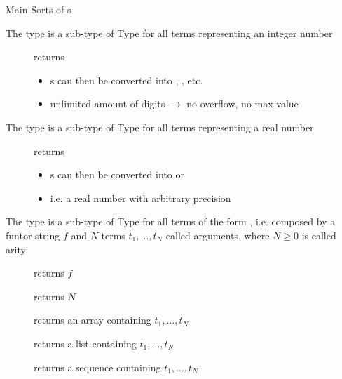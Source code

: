 \documentclass[handout]{beamer}
\begin{document}
\begin{frame}[allowframebreaks]{Main Sorts of s}
    \framebreak

    \begin{block}{The  type is a sub-type of }\centering
        Type for all terms representing an integer number
    \end{block}
    \begin{description}
        \item[] returns 
        \begin{itemize}
            \item {}s can then be converted into , , etc.
            \item unlimited amount of digits $\rightarrow$ no overflow, no max value
        \end{itemize}
    \end{description}


    \framebreak

    \begin{block}{The  type is a sub-type of }\centering
        Type for all terms representing a real number
    \end{block}
    \begin{description}
        \item[] returns 
        \begin{itemize}
            \item {}s can then be converted into  or 
            \item i.e. a real number with arbitrary precision
        \end{itemize}
    \end{description}


    \framebreak

    \begin{block}{The  type is a sub-type of }\centering
        Type for all terms of the form , i.e. composed by a \alert{funtor} string $f$ and $N$ terms $t_1, \ldots, t_N$ called \alert{arguments}, where $N \geq 0$ is called \alert{arity}
    \end{block}
    \begin{description}
        \item[] returns $f$
        \item[] returns $N$
        \item[] returns an array containing $t_1, \ldots, t_N$
        \item[] returns a list containing $t_1, \ldots, t_N$
        \item[] returns a sequence containing $t_1, \ldots, t_N$


\end{description}
\end{frame}
\end{document}
